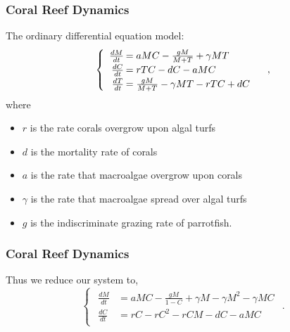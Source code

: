 \begin{frame}\frametitle{Coral Reef Dynamics}
The ordinary differential equation model:
$$\begin{cases}\begin{array}{rl}
\frac{dM}{dt}\hspace{-.8em}&=aMC - \frac{gM}{M+T} + \gamma M T\\
\frac{dC}{dt}\hspace{-.8em}&=rTC - dC - aMC\\
\frac{dT}{dt}\hspace{-.8em}&=\frac{gM}{M + T} - \gamma MT - rTC + dC
\end{array}\end{cases},$$ where \begin{itemize}\itemsep0pt
\item $r$ is the rate corals overgrow upon algal turfs\\
\item $d$ is the mortality rate of corals\\
\item $a$ is the rate that macroalgae overgrow upon corals\\
\item $\gamma$ is the rate that macroalgae spread over algal turfs\\
\item $g$ is the indiscriminate grazing rate of parrotfish.
\end{itemize}
\end{frame}

\begin{frame}\frametitle{Coral Reef Dynamics}
\hspace{1.57em}
Thus we reduce our system to, $$\begin{cases}
\begin{array}{rl}
\frac{dM}{dt}&= aMC-\frac{gM}{1-C} + \gamma M - \gamma M^2 -\gamma M C\\
\frac{dC}{dt}&=rC - rC^2 - rCM - dC - aMC
\end{array} \end{cases}.$$
\end{frame}

